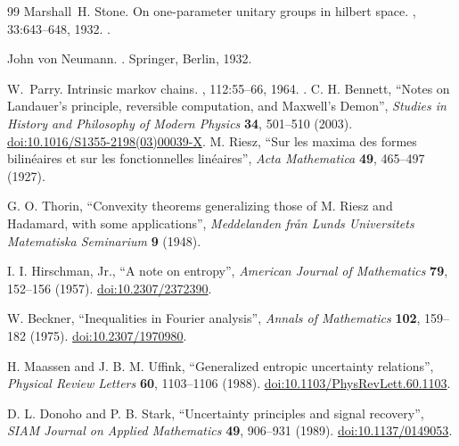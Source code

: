 \begin{thebibliography}{99}
Marshall~H. Stone.
\newblock On one-parameter unitary groups in hilbert space.
, 33:643--648, 1932.
\newblock \href {https://doi.org/10.2307/1968538} {}.

John von Neumann.
.
\newblock Springer, Berlin, 1932.

W.~Parry.
\newblock Intrinsic markov chains.
, 112:55--66,
  1964.
\newblock \href {https://doi.org/10.1090/S0002-9947-1964-0161372-1}
  {}.
 C. H. Bennett, ``Notes on Landauer's principle,
reversible computation, and Maxwell's Demon'', \emph{Studies in History
and Philosophy of Modern Physics} \textbf{34}, 501--510 (2003).
\href{https://doi.org/10.1016/S1355-2198(03)00039-X}{doi:10.1016/S1355-2198(03)00039-X}.
M. Riesz, ``Sur les maxima des formes bilinéaires et sur les
fonctionnelles linéaires'', \emph{Acta Mathematica} \textbf{49},
465--497 (1927).

G. O. Thorin, ``Convexity theorems generalizing those of M. Riesz and
Hadamard, with some applications'',
\emph{Meddelanden från Lunds Universitets Matematiska Seminarium}
\textbf{9} (1948).

I. I. Hirschman, Jr., ``A note on entropy'',
\emph{American Journal of Mathematics} \textbf{79}, 152--156 (1957).
\href{https://doi.org/10.2307/2372390}{doi:10.2307/2372390}.

W. Beckner, ``Inequalities in Fourier analysis'',
\emph{Annals of Mathematics} \textbf{102}, 159--182 (1975).
\href{https://doi.org/10.2307/1970980}{doi:10.2307/1970980}.

H. Maassen and J. B. M. Uffink, ``Generalized entropic uncertainty
relations'', \emph{Physical Review Letters} \textbf{60},
1103--1106 (1988).
\href{https://doi.org/10.1103/PhysRevLett.60.1103}{doi:10.1103/PhysRevLett.60.1103}.

D. L. Donoho and P. B. Stark, ``Uncertainty principles and signal
recovery'', \emph{SIAM Journal on Applied Mathematics} \textbf{49},
906--931 (1989).
\href{https://doi.org/10.1137/0149053}{doi:10.1137/0149053}.

\end{thebibliography}

\par\endgroup
